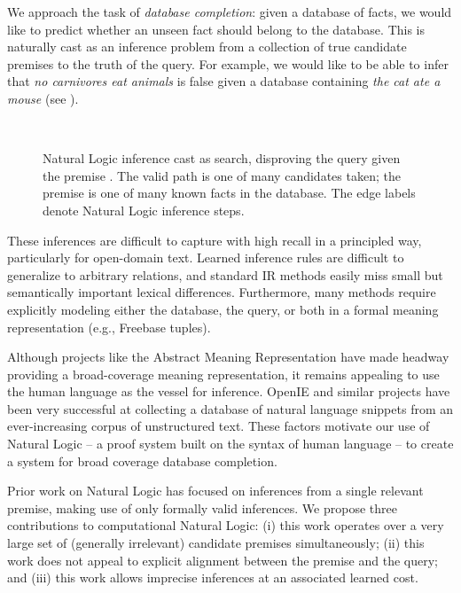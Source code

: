 We approach the task of \textit{database completion}: given a
  database of facts, we would like to predict whether an unseen fact
  should belong to the database.
This is naturally cast as an inference problem from 
  a collection of true candidate premises to the truth of the query.
For example, we would like to be able to infer 
  that \textit{no carnivores eat animals}
  is false given a database containing \textit{the cat ate a mouse}
  (see ).

\begin{figure}[th]
\begin{center}
  \resizebox{0.48\textwidth}{!}{\teaserSearch} \\
\end{center}
\caption{
  Natural Logic inference cast as search, disproving the
    query  given the premise
    .
  The valid path is one of many candidates taken; the premise
    is one of many known facts in the database.
  The edge labels denote Natural Logic inference steps.
  \label{fig:teaser}
}
\end{figure}

These inferences are difficult to capture with high recall 
  in a principled way, particularly for open-domain text.
Learned inference rules are difficult to generalize to arbitrary
  relations, and standard IR methods easily miss small but
  semantically important lexical differences.
Furthermore, many methods require explicitly modeling either the
  database, the query, or both in a formal meaning representation
  (e.g., Freebase tuples).

Although projects like the Abstract Meaning Representation
  \cite{key:2013banarescu-amr} have made headway providing a
  broad-coverage meaning representation, it remains 
  appealing to use the human language as the vessel for
  inference.
OpenIE and similar projects have been very successful at
  collecting a database of natural language snippets
  from an ever-increasing corpus of unstructured text.
These factors motivate our use of Natural Logic -- a proof system built
  on the syntax of human language -- to create a system for
  broad coverage database completion.

Prior work on Natural Logic has focused on inferences from a single
  relevant premise, making use of only
  formally valid inferences.
We propose three contributions to computational Natural Logic:
  (i) this work operates over a very large set of (generally irrelevant)
    candidate premises simultaneously;
  (ii) this work does not
    appeal to explicit alignment between the premise and the query;
  and (iii) this work allows imprecise inferences at an
    associated learned cost.

